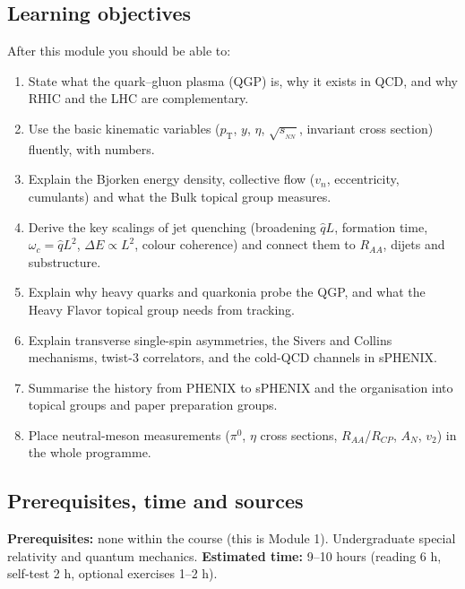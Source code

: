 \documentclass[11pt,letterpaper]{article}
\newcommand{\sqs}{\sqrt{s_{_{NN}}}}
\newcommand{\pT}{p_{\mathrm{T}}}
\newcommand{\RAA}{R_{AA}}
\begin{document}
\subsection*{Learning objectives}
After this module you should be able to:
\begin{enumerate}[label=O\arabic*.]
\item State what the quark--gluon plasma (QGP) is, why it exists in QCD, and why RHIC and the LHC are complementary.
\item Use the basic kinematic variables ($\pT$, $y$, $\eta$, $\sqs$, invariant cross section) fluently, with numbers.
\item Explain the Bjorken energy density, collective flow ($v_n$, eccentricity, cumulants) and what the Bulk topical group measures.
\item Derive the key scalings of jet quenching (broadening $\hat q L$, formation time, $\omega_c=\hat qL^2$, $\Delta E\propto L^2$, colour coherence) and connect them to $\RAA$, dijets and substructure.
\item Explain why heavy quarks and quarkonia probe the QGP, and what the Heavy Flavor topical group needs from tracking.
\item Explain transverse single-spin asymmetries, the Sivers and Collins mechanisms, twist-3 correlators, and the cold-QCD channels in sPHENIX.
\item Summarise the history from PHENIX to sPHENIX and the organisation into topical groups and paper preparation groups.
\item Place neutral-meson measurements ($\pi^0$, $\eta$ cross sections, $\RAA$/$R_{CP}$, $A_N$, $v_2$) in the whole programme.
\end{enumerate}

\subsection*{Prerequisites, time and sources}
\textbf{Prerequisites:} none within the course (this is Module 1). Undergraduate special relativity and quantum mechanics.
\textbf{Estimated time:} 9--10 hours (reading 6 h, self-test 2 h, optional exercises 1--2 h).
\end{document}
